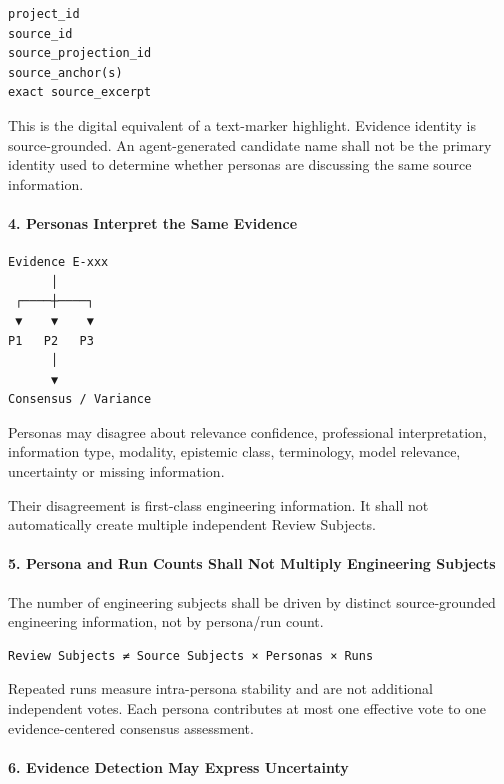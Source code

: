 \begin{verbatim}
project_id
source_id
source_projection_id
source_anchor(s)
exact source_excerpt
\end{verbatim}

This is the digital equivalent of a text-marker highlight. Evidence identity is source-grounded. An agent-generated candidate name shall not be the primary identity used to determine whether personas are discussing the same source information.

\hypertarget{4-personas-interpret-the-same-evidence}{%
\paragraph{4. Personas Interpret the Same Evidence}\label{4-personas-interpret-the-same-evidence}}

\begin{verbatim}
Evidence E-xxx
      │
 ┌────┼────┐
 ▼    ▼    ▼
P1   P2   P3
      │
      ▼
Consensus / Variance
\end{verbatim}

Personas may disagree about relevance confidence, professional interpretation, information type, modality, epistemic class, terminology, model relevance, uncertainty or missing information.

Their disagreement is first-class engineering information. It shall not automatically create multiple independent Review Subjects.

\hypertarget{5-persona-and-run-counts-shall-not-multiply-engineering-subjects}{%
\paragraph{5. Persona and Run Counts Shall Not Multiply Engineering Subjects}\label{5-persona-and-run-counts-shall-not-multiply-engineering-subjects}}

The number of engineering subjects shall be driven by distinct source-grounded engineering information, not by persona/run count.

\begin{verbatim}
Review Subjects ≠ Source Subjects × Personas × Runs
\end{verbatim}

Repeated runs measure intra-persona stability and are not additional independent votes. Each persona contributes at most one effective vote to one evidence-centered consensus assessment.

\hypertarget{6-evidence-detection-may-express-uncertainty}{%
\paragraph{6. Evidence Detection May Express Uncertainty}\label{6-evidence-detection-may-express-uncertainty}}

